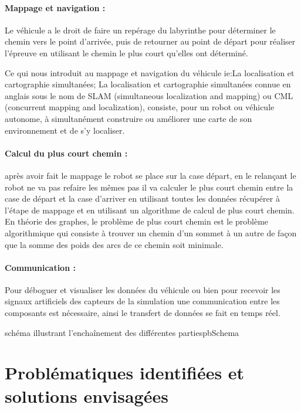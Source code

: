\paragraph{Mappage et navigation :} Le véhicule a le droit de faire un repérage du labyrinthe 
pour déterminer le chemin vers le point d'arrivée, puis de retourner au point de départ pour 
réaliser l'épreuve en utilisant le chemin le plus court qu'elles ont déterminé.

Ce qui nous introduit au mappage et navigation du véhicule ie:La localisation 
et cartographie simultanées; La localisation et cartographie simultanées connue en 
anglais sous le nom de SLAM (simultaneous localization and mapping) ou CML (concurrent mapping 
and localization), consiste, pour un robot ou véhicule autonome, à simultanément construire ou 
améliorer une carte de son environnement et de s’y localiser.

\paragraph{Calcul du plus court chemin :}après avoir fait le mappage le robot se place sur la 
case départ, en le relançant le robot ne va pas refaire les mêmes pas il va calculer le plus court 
chemin entre la case de départ et la case d'arriver en utilisant toutes les données récupérer à 
l'étape de mappage et en utilisant un algorithme de calcul de plus court chemin. \\

   En théorie des graphes, le problème de plus court chemin est le problème algorithmique qui 
consiste à trouver un chemin d'un sommet à un autre de façon que la somme des poids des arcs de ce chemin soit minimale. \\

\paragraph{Communication :}Pour déboguer et visualiser les données du véhicule ou bien pour recevoir les signaux artificiels des capteurs de la simulation une communication entre les composants est nécessaire, ainsi le transfert de données se fait en temps réel.

{schéma illustrant l’enchaînement des différentes parties}{pbSchema}

\section{Problématiques identifiées et solutions envisagées} \label{sec:problemesSolutions}

